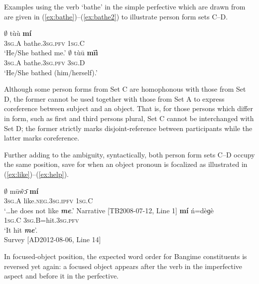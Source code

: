 \documentclass[output=paper]{langscibook}
\begin{document}
Examples using the verb `bathe' in the simple perfective which are drawn from \cite[~325]{HantganHeath2018} are given in (\ref{ex:bathe})--(\ref{ex:bathe2}) to illustrate person form sets C--D.
\begin{multicols}{2}
	\ea \label{ex:bathe}
	\gll $\emptyset$ tùù \textbf{mí} \\
	3\textsc{sg}.A bathe.3\textsc{sg}.\textsc{pfv} 1\textsc{sg}.C \\
	\glt `He/She bathed me.' 
	\z
	\ea \label{ex:bathe2}
	\gll $\emptyset$ tùū \textbf{mīì} \\
	3\textsc{sg}.A bathe.3\textsc{sg}.\textsc{pfv} 3\textsc{sg}.D \\
	\glt `He/She bathed (him/herself).' 
	\z
\end{multicols}
Although some person forms from Set C are homophonous with those from Set D, the former cannot be used together with those from Set A to express coreference between subject and an object. That is, for those persons which differ in form, such as first and third persons plural, Set C cannot be interchanged with Set D; the former strictly marks disjoint-reference between participants while the latter marks coreference.

Further adding to the ambiguity, syntactically, both person form sets C--D occupy the same position, save for when an object pronoun is focalized as illustrated in (\ref{ex:like})--(\ref{ex:help}).
	\begin{multicols}{2}
	\ea \label{ex:like}
	\gll $\emptyset$ mūw̃ɔ̄ \textbf{mí} \\
	3\textsc{sg}.A like.\textsc{neg}.3\textsc{sg}.\textsc{ipfv} 1\textsc{sg}.C \\
	\glt `\dots he does not like \textbf{\textit{me}}.' Narrative [TB2008-07-12, Line 1]
	\z			
	\ea \label{ex:help}
	\gll \textbf{mí} ń=dèɡè \\
	1\textsc{sg}.C 3\textsc{sg}.B=hit.3\textsc{sg}.\textsc{pfv} \\
	\glt `It hit \textbf{\textit{me}}'. \\ 
	Survey [AD2012-08-06, Line 14]
	\z
\end{multicols}
In focused-object position, the expected word order for Bangime constituents is reversed yet again: a focused object appears after the verb in the imperfective aspect and before it in the perfective.
\end{document}

